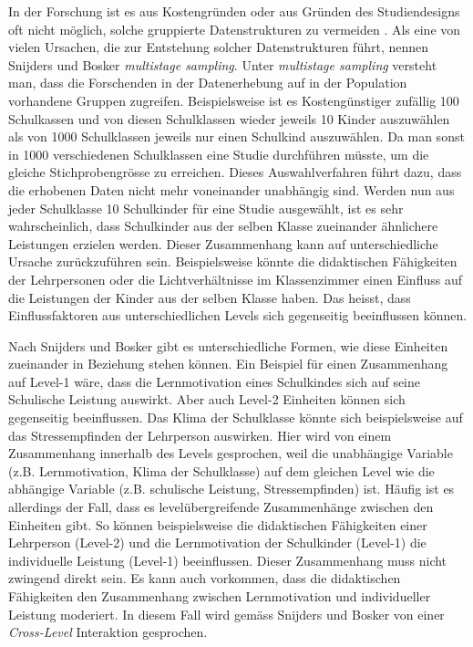 \documentclass[12pt]{article}\usepackage[]{graphicx}\usepackage[]{color}
\begin{document}
In der Forschung ist es aus Kostengründen oder aus Gründen des Studiendesigns oft nicht möglich, solche gruppierte Datenstrukturen zu vermeiden \citep{SnijdersTomA.B2012Ma:a, woltman2012introduction}. Als eine von vielen Ursachen, die zur Entstehung solcher Datenstrukturen führt, nennen Snijders und Bosker \citeyearpar{SnijdersTomA.B2012Ma:a} \textit{multistage sampling}. Unter \textit{multistage sampling} versteht man, dass die Forschenden in der Datenerhebung auf in der Population vorhandene Gruppen zugreifen. Beispielsweise ist es Kostengünstiger zufällig 100 Schulkassen und von diesen Schulklassen wieder jeweils 10 Kinder auszuwählen als von 1000 Schulklassen jeweils nur einen Schulkind auszuwählen. Da man sonst in 1000 verschiedenen Schulklassen eine Studie durchführen müsste, um die gleiche Stichprobengrösse zu erreichen. Dieses Auswahlverfahren führt dazu, dass die erhobenen Daten nicht mehr voneinander unabhängig sind. Werden nun aus jeder Schulklasse 10 Schulkinder für eine Studie ausgewählt, ist es sehr wahrscheinlich, dass Schulkinder aus der selben Klasse zueinander ähnlichere Leistungen erzielen werden. Dieser Zusammenhang kann auf unterschiedliche Ursache zurückzuführen sein. Beispielsweise könnte die didaktischen Fähigkeiten der Lehrpersonen oder die Lichtverhältnisse im Klassenzimmer einen Einfluss auf die Leistungen der Kinder aus der selben Klasse haben. Das heisst, dass Einflussfaktoren aus unterschiedlichen Levels sich gegenseitig beeinflussen können. 

Nach Snijders und Bosker \citeyearpar{SnijdersTomA.B2012Ma:a} gibt es unterschiedliche Formen, wie diese Einheiten zueinander in Beziehung stehen können. Ein Beispiel für einen Zusammenhang auf Level-1 wäre, dass die Lernmotivation eines Schulkindes sich auf seine Schulische Leistung auswirkt. Aber auch Level-2 Einheiten können sich gegenseitig beeinflussen. Das Klima der Schulklasse könnte sich beispielsweise auf das Stressempfinden der Lehrperson auswirken. Hier wird von einem Zusammenhang innerhalb des Levels gesprochen, weil die unabhängige Variable (z.B. Lernmotivation, Klima der Schulklasse) auf dem gleichen Level wie die abhängige Variable (z.B. schulische Leistung, Stressempfinden) ist. Häufig ist es allerdings der Fall, dass es levelübergreifende Zusammenhänge zwischen den Einheiten gibt. So können beispielsweise die didaktischen Fähigkeiten einer Lehrperson (Level-2) und die Lernmotivation der Schulkinder (Level-1) die individuelle Leistung (Level-1) beeinflussen. Dieser Zusammenhang muss nicht zwingend direkt sein. Es kann auch vorkommen, dass die didaktischen Fähigkeiten den Zusammenhang zwischen Lernmotivation und individueller Leistung moderiert. In diesem Fall wird gemäss Snijders und Bosker \citeyearpar{SnijdersTomA.B2012Ma:a} von einer \textit{Cross-Level} Interaktion gesprochen.
\end{document}
